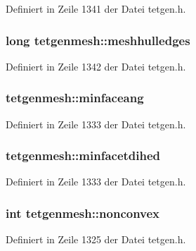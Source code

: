 Definiert in Zeile 1341 der Datei tetgen.\-h.

\hypertarget{classtetgenmesh_a3b6b4c6760ec4d19b69cc1f504486e98}{
\subsubsection[{meshhulledges}]{\setlength{\rightskip}{0pt plus 5cm}long tetgenmesh\-::meshhulledges}}\label{classtetgenmesh_a3b6b4c6760ec4d19b69cc1f504486e98}


Definiert in Zeile 1342 der Datei tetgen.\-h.

\hypertarget{classtetgenmesh_a6baefb6eda35b7b77f6b065425ee8247}{
\subsubsection[{minfaceang}]{ tetgenmesh\-::minfaceang}}\label{classtetgenmesh_a6baefb6eda35b7b77f6b065425ee8247}


Definiert in Zeile 1333 der Datei tetgen.\-h.

\hypertarget{classtetgenmesh_aef1e8aebb8ed75a53622d4805e4c68dd}{
\subsubsection[{minfacetdihed}]{ tetgenmesh\-::minfacetdihed}}\label{classtetgenmesh_aef1e8aebb8ed75a53622d4805e4c68dd}


Definiert in Zeile 1333 der Datei tetgen.\-h.

\hypertarget{classtetgenmesh_ab92b76b15a48ed42db8db49dc2b3a651}{
\subsubsection[{nonconvex}]{\setlength{\rightskip}{0pt plus 5cm}int tetgenmesh\-::nonconvex}}\label{classtetgenmesh_ab92b76b15a48ed42db8db49dc2b3a651}


Definiert in Zeile 1325 der Datei tetgen.\-h.

